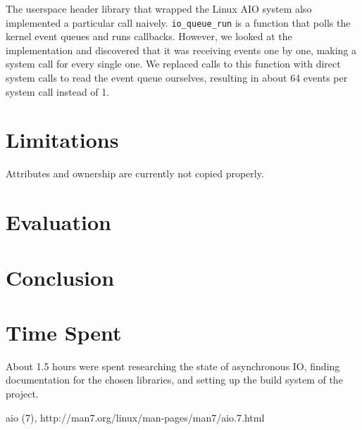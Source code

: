 \documentclass[11pt]{article}
\begin{document}
The userspace header library that wrapped the Linux AIO system also implemented
a particular call naively. \texttt{io\_queue\_run} is a function that polls the
kernel event queues and runs callbacks. However, we looked at the implementation
and discovered that it was receiving events one by one, making a system call for
every single one. We replaced calls to this function with direct system calls to
read the event queue ourselves, resulting in about 64 events per system call
instead of 1.

\section{Limitations}

Attributes and ownership are currently not copied properly.

\section{Evaluation}

\section{Conclusion}

\section{Time Spent}

About 1.5 hours were spent researching the state of asynchronous IO, finding
documentation for the chosen libraries, and setting up the build system of the
project.

\begin{thebibliography}{99}
        aio (7), http://man7.org/linux/man-pages/man7/aio.7.html
\end{thebibliography}
\end{document}
